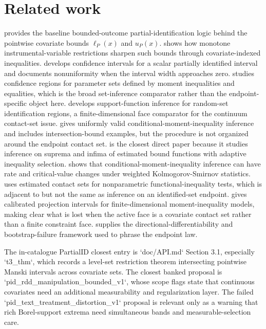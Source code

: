 \documentclass[11pt]{article}
\theoremstyle{definition}
\theoremstyle{plain}
\theoremstyle{remark}
\begin{document}
\section{Related work}
\citet{Manski1990} provides the baseline bounded-outcome partial-identification logic behind the pointwise covariate bounds \(\ell_P(x)\) and \(u_P(x)\).  \citet{ManskiPepper2000} shows how monotone instrumental-variable restrictions sharpen such bounds through covariate-indexed inequalities.  \citet{ImbensManski2004} develops confidence intervals for a scalar partially identified interval and documents nonuniformity when the interval width approaches zero.  \citet{ChernozhukovHongTamer2007} studies confidence regions for parameter sets defined by moment inequalities and equalities, which is the broad set-inference comparator rather than the endpoint-specific object here.  \citet{BeresteanuMolinari2008} develops support-function inference for random-set identification regions, a finite-dimensional face comparator for the continuum contact-set issue.  \citet{AndrewsShi2013} gives uniformly valid conditional-moment-inequality inference and includes intersection-bound examples, but the procedure is not organized around the endpoint contact set.  \citet{ChernozhukovLeeRosen2013} is the closest direct paper because it studies inference on suprema and infima of estimated bound functions with adaptive inequality selection.  \citet{Armstrong2014} shows that conditional-moment-inequality inference can have rate and critical-value changes under weighted Kolmogorov-Smirnov statistics.  \citet{LeeSongWhang2018} uses estimated contact sets for nonparametric functional-inequality tests, which is adjacent to but not the same as inference on an identified-set endpoint.  \citet{KaidoMolinariStoye2019} gives calibrated projection intervals for finite-dimensional moment-inequality models, making clear what is lost when the active face is a covariate contact set rather than a finite constraint face.  \citet{FangSantos2019} supplies the directional-differentiability and bootstrap-failure framework used to phrase the endpoint law.

The in-catalogue PartialID closest entry is `doc/API.md` Section 3.1, especially `t3_thm`, which records a level-set restriction theorem intersecting pointwise Manski intervals across covariate sets.  The closest banked proposal is `pid_rdd_manipulation_bounded_v1`, whose scope flags state that continuous covariates need an additional measurability and regularization layer.  The failed `pid_text_treatment_distortion_v1` proposal is relevant only as a warning that rich Borel-support extrema need simultaneous bands and measurable-selection care.
\end{document}
